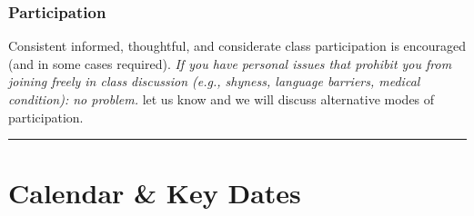 \documentclass[
  10pt,
  letterpaper,
  oneside,
  open=any]{scrbook}
\begin{document}
\subsection*{Participation}\label{participation}

Consistent informed, thoughtful, and considerate class participation is
encouraged (and in some cases required). \emph{If you have personal
issues that prohibit you from joining freely in class discussion (e.g.,
shyness, language barriers, medical condition): no problem.} let us know
and we will discuss alternative modes of participation.

\begin{center}\rule{0.5\linewidth}{0.5pt}\end{center}


\chapter{Calendar \& Key Dates}\label{calendar-key-dates}

\begingroup\fontsize{9}{11}\selectfont
\end{document}

